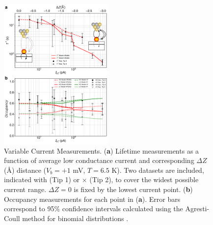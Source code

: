 \documentclass[
reprint,amsmath,amssymb,aps]{revtex4-2}
\begin{document}
\begin{figure}[h!]
\includegraphics[width=0.5\textwidth]{fig5_final_v3.pdf}
\caption{Variable Current Measurements. (\textbf{a}) Lifetime measurements as a function of average low conductance current and corresponding $\Delta Z$ (\AA) distance ($V_{b} = +1$ mV, $T = 6.5$ K). Two datasets are included, indicated with \circle (Tip 1) or $\times$ (Tip 2), to cover the widest possible current range. $\Delta Z = 0$ is fixed by the lowest current point. (\textbf{b}) Occupancy measurements for each point in (\textbf{a}). Error bars correspond to 95$\%$ confidence intervals calculated using the Agresti-Coull method for binomial distributions \citep{agresti1998}. 
\label{fig:current} }
\end{figure}
\end{document}
